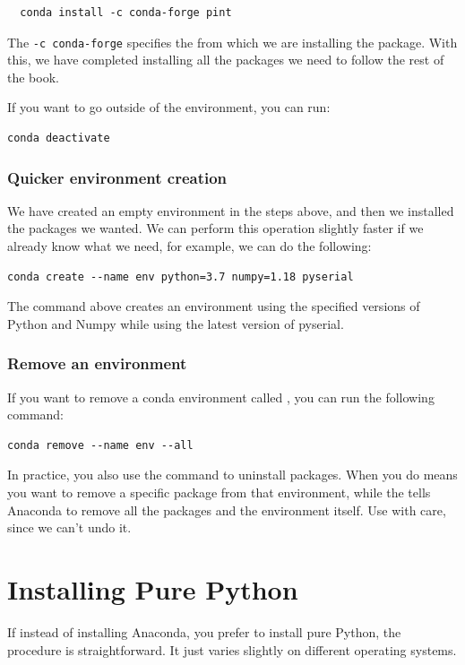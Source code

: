 \begin{verbatim}
  conda install -c conda-forge pint
\end{verbatim}

The \texttt{-c conda-forge} specifies the  from which we are installing the package. With this, we have completed installing all the packages we need to follow the rest of the book.

If you want to go outside of the environment, you can run:

\begin{verbatim}
conda deactivate
\end{verbatim}

\subsubsection{Quicker environment creation}
We have created an empty environment in the steps above, and then we installed the packages we wanted. We can perform this operation slightly faster if we already know what we need, for example, we can do the following:

\begin{verbatim}
conda create --name env python=3.7 numpy=1.18 pyserial
\end{verbatim}

The command above creates an environment using the specified versions of Python and Numpy while using the latest version of pyserial.

\subsubsection{Remove an environment}
If you want to remove a conda environment called , you can run the following command:

\begin{verbatim}
conda remove --name env --all
\end{verbatim}

\sloppy In practice, you also use the  command to uninstall packages. When you do  means you want to remove a specific package from that environment, while the  tells Anaconda to remove all the packages and the environment itself. Use with care, since we can't undo it.

\section{Installing Pure Python}\label{sec:installing-pure-python}
If instead of installing Anaconda, you prefer to install pure Python, the procedure is straightforward. It just varies slightly on different operating systems.

